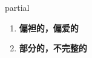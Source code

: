
\begin{frame}
{\huge partial}
\begin{center}
\begin{enumerate}\Large
  \item \textbf{偏袒的，偏爱的}
  \item \textbf{部分的，不完整的}
\end{enumerate}
\end{center}
\end{frame}

